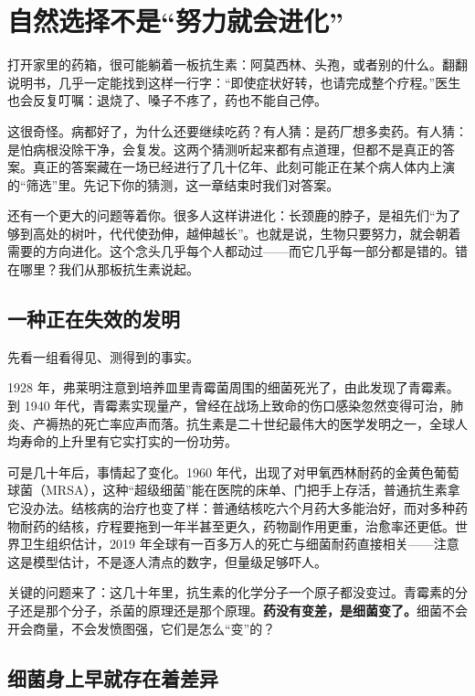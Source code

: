 \chapter{自然选择不是“努力就会进化”}

\begin{kaichang}
打开家里的药箱，很可能躺着一板抗生素：阿莫西林、头孢，或者别的什么。翻翻说明书，几乎一定能找到这样一行字：“即使症状好转，也请完成整个疗程。”医生也会反复叮嘱：退烧了、嗓子不疼了，药也不能自己停。

这很奇怪。病都好了，为什么还要继续吃药？有人猜：是药厂想多卖药。有人猜：是怕病根没除干净，会复发。这两个猜测听起来都有点道理，但都不是真正的答案。真正的答案藏在一场已经进行了几十亿年、此刻可能正在某个病人体内上演的“筛选”里。先记下你的猜测，这一章结束时我们对答案。

还有一个更大的问题等着你。很多人这样讲进化：长颈鹿的脖子，是祖先们“为了够到高处的树叶，代代使劲伸，越伸越长”。也就是说，生物只要努力，就会朝着需要的方向进化。这个念头几乎每个人都动过——而它几乎每一部分都是错的。错在哪里？我们从那板抗生素说起。
\end{kaichang}

\section{一种正在失效的发明}

先看一组看得见、测得到的事实。

1928 年，弗莱明注意到培养皿里青霉菌周围的细菌死光了，由此发现了青霉素。到 1940 年代，青霉素实现量产，曾经在战场上致命的伤口感染忽然变得可治，肺炎、产褥热的死亡率应声而落。抗生素是二十世纪最伟大的医学发明之一，全球人均寿命的上升里有它实打实的一份功劳。

可是几十年后，事情起了变化。1960 年代，出现了对甲氧西林耐药的金黄色葡萄球菌（MRSA），这种“超级细菌”能在医院的床单、门把手上存活，普通抗生素拿它没办法。结核病的治疗也变了样：普通结核吃六个月药大多能治好，而对多种药物耐药的结核，疗程要拖到一年半甚至更久，药物副作用更重，治愈率还更低。世界卫生组织估计，2019 年全球有一百多万人的死亡与细菌耐药直接相关——注意这是模型估计，不是逐人清点的数字，但量级足够吓人。

关键的问题来了：这几十年里，抗生素的化学分子一个原子都没变过。青霉素的分子还是那个分子，杀菌的原理还是那个原理。\textbf{药没有变差，是细菌变了。}细菌不会开会商量，不会发愤图强，它们是怎么“变”的？

\section{细菌身上早就存在着差异}

